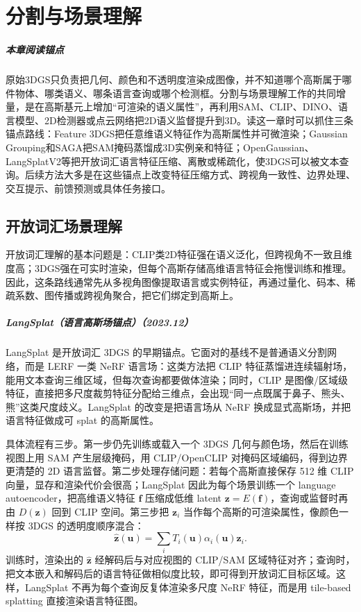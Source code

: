 \chapter{分割与场景理解}

\paragraph*{本章阅读锚点}
原始3DGS只负责把几何、颜色和不透明度渲染成图像，并不知道哪个高斯属于哪件物体、哪类语义、哪条语言查询或哪个检测框。分割与场景理解工作的共同增量，是在高斯基元上增加“可渲染的语义属性”，再利用SAM、CLIP、DINO、语言模型、2D检测器或点云网络把2D语义监督提升到3D。读这一章时可以抓住三条锚点路线：Feature 3DGS把任意维语义特征作为高斯属性并可微渲染；Gaussian Grouping和SAGA把SAM掩码蒸馏成3D实例亲和特征；OpenGaussian、LangSplatV2等把开放词汇语言特征压缩、离散或稀疏化，使3DGS可以被文本查询。后续方法大多是在这些锚点上改变特征压缩方式、跨视角一致性、边界处理、交互提示、前馈预测或具体任务接口。

\section{开放词汇场景理解}

开放词汇理解的基本问题是：CLIP类2D特征强在语义泛化，但跨视角不一致且维度高；3DGS强在可实时渲染，但每个高斯存储高维语言特征会拖慢训练和推理。因此，这条路线通常先从多视角图像提取语言或实例特征，再通过量化、码本、稀疏系数、图传播或跨视角聚合，把它们绑定到高斯上。



\paragraph{LangSplat（语言高斯场锚点）（2023.12）\cite{2312_16084}}
LangSplat 是开放词汇 3DGS 的早期锚点。它面对的基线不是普通语义分割网络，而是 LERF 一类 NeRF 语言场：这类方法把 CLIP 特征蒸馏进连续辐射场，能用文本查询三维区域，但每次查询都要做体渲染；同时，CLIP 是图像/区域级特征，直接把多尺度裁剪特征分配给三维点，会出现“同一点既属于鼻子、熊头、熊”这类尺度歧义。LangSplat 的改变是把语言场从 NeRF 换成显式高斯场，并把语言特征做成可 splat 的高斯属性。

具体流程有三步。第一步仍先训练或载入一个 3DGS 几何与颜色场，然后在训练视图上用 SAM 产生层级掩码，用 CLIP/OpenCLIP 对掩码区域编码，得到边界更清楚的 2D 语言监督。第二步处理存储问题：若每个高斯直接保存 512 维 CLIP 向量，显存和渲染代价会很高；LangSplat 因此为每个场景训练一个 language autoencoder，把高维语义特征 $\mathbf f$ 压缩成低维 latent $\mathbf z=E(\mathbf f)$，查询或监督时再由 $D(\mathbf z)$ 回到 CLIP 空间。第三步把 $\mathbf z_i$ 当作每个高斯的可渲染属性，像颜色一样按 3DGS 的透明度顺序混合：
\[
  \hat{\mathbf z}(\mathbf u)=\sum_i T_i(\mathbf u)\alpha_i(\mathbf u)\mathbf z_i .
\]
训练时，渲染出的 $\hat{\mathbf z}$ 经解码后与对应视图的 CLIP/SAM 区域特征对齐；查询时，把文本嵌入和解码后的语言特征做相似度比较，即可得到开放词汇目标区域。这样，LangSplat 不再为每个查询反复体渲染多尺度 NeRF 特征，而是用 tile-based splatting 直接渲染语言特征图。

